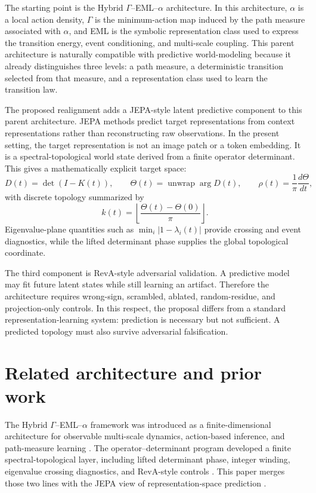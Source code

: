 \documentclass[11pt]{article}
\begin{document}
The starting point is the Hybrid $\Gamma$--EML--$\alpha$ architecture. In this architecture, $\alpha$ is a local action density, $\Gamma$ is the minimum-action map induced by the path measure associated with $\alpha$, and EML is the symbolic representation class used to express the transition energy, event conditioning, and multi-scale coupling. This parent architecture is naturally compatible with predictive world-modeling because it already distinguishes three levels: a path measure, a deterministic transition selected from that measure, and a representation class used to learn the transition law.

The proposed realignment adds a JEPA-style latent predictive component to this parent architecture. JEPA methods predict target representations from context representations rather than reconstructing raw observations. In the present setting, the target representation is not an image patch or a token embedding. It is a spectral-topological world state derived from a finite operator determinant. This gives a mathematically explicit target space:
\begin{equation}
D(t)=\det(I-K(t)),\qquad \Theta(t)=\operatorname{unwrap}\arg D(t),\qquad \rho(t)=\frac{1}{\pi}\frac{d\Theta}{dt},
\end{equation}
with discrete topology summarized by
\begin{equation}
k(t)=\left\lfloor \frac{\Theta(t)-\Theta(0)}{\pi}\right\rfloor .
\end{equation}
Eigenvalue-plane quantities such as $\min_i |1-\lambda_i(t)|$ provide crossing and event diagnostics, while the lifted determinant phase supplies the global topological coordinate.

The third component is RevA-style adversarial validation. A predictive model may fit future latent states while still learning an artifact. Therefore the architecture requires wrong-sign, scrambled, ablated, random-residue, and projection-only controls. In this respect, the proposal differs from a standard representation-learning system: prediction is necessary but not sufficient. A predicted topology must also survive adversarial falsification.

\section{Related architecture and prior work}
The Hybrid $\Gamma$--EML--$\alpha$ framework was introduced as a finite-dimensional architecture for observable multi-scale dynamics, action-based inference, and path-measure learning \cite{JoseHybrid2026,JoseDistributed2026}. The operator--determinant program developed a finite spectral-topological layer, including lifted determinant phase, integer winding, eigenvalue crossing diagnostics, and RevA-style controls \cite{JoseOperator2026}. This paper merges those two lines with the JEPA view of representation-space prediction \cite{Assran2023,DawidLeCun2023,LeCun2022}.
\end{document}
